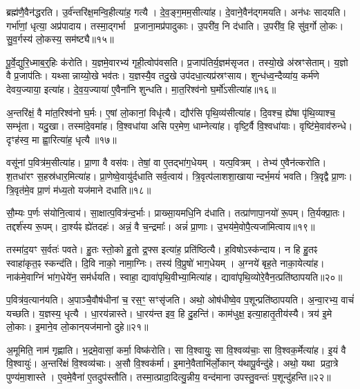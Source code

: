 ब्रह्म॑णै॒वैन॑द्धरति।
उ॒र्व॑न्तरि॑क्ष॒मन्वि॒हीत्या॑ह॒ गत्यै।
दे॒व॒ङ्ग॒मम॒सी\-त्या॑ह।
दे॒वाने॒वैन॑द्गमयति।
अन॑धः सादयति।
गर्भा॑णां॒ धृत्या॒ अप्र॑पादाय।
तस्मा॒द्गर्भा प्र॒जाना॒मप्र॑पादुकाः।
उ॒परी॑व॒ नि द॑धाति।
उ॒परी॑व॒ हि सु॑व॒र्गो लो॒कः।
सु॒व॒र्गस्य॑ लो॒कस्य॒ सम॑ष्ट्यै॥१५॥\anuvakamend[स॒यो॒नि॒त्वाय॑ स्व॒धाकृ॑ता॒\-ऽसीत्या॑ह दाया॒द्वेद॑ भरति जायन्ते॒ बृह॒स्पतिः॒ सम॑ष्ट्यै]

पू॒र्वे॒द्युरि॒ध्माब॒र्॒हिः क॑रोति।
य॒ज्ञमे॒वारभ्य॑ गृही॒त्वोप॑वसति।
प्र॒जाप॑तिर्य॒ज्ञम॑सृजत।
तस्यो॒खे अ॑स्रꣳसेताम्।
य॒ज्ञो वै प्र॒जाप॑तिः।
यथ्सान्नाय्यो॒खे भव॑तः।
य॒ज्ञस्यै॒व तदु॒खे उप॑दधा॒त्यप्र॑स्रꣳसाय।
शुन्ध॑ध्व॒न्दैव्या॑य॒ कर्म॑णे देवय॒ज्याया॒ इत्या॑ह।
दे॒व॒य॒ज्याया॑ ए॒वैना॑नि शुन्धति।
मा॒त॒रिश्व॑नो घ॒र्मो॑\-ऽसीत्या॑ह॥१६॥

अ॒न्तरि॑क्षं॒ वै मा॑त॒रिश्व॑नो घ॒र्मः।
ए॒षां लो॒कानां॒ विधृ॑त्यै।
द्यौर॑सि पृथि॒व्य॑सीत्या॑ह।
दि॒वश्च॒ ह्ये॑षा पृ॑थि॒व्याश्च॒ सम्भृ॑ता।
यदु॒खा।
तस्मा॑दे॒वमा॑ह।
वि॒श्वधा॑या असि पर॒मेण॒ धाम्नेत्या॑ह।
वृष्टि॒र्वै वि॒श्वधा॑याः।
वृष्टि॑मे॒वाव॑रुन्धे।
दृꣳह॑स्व॒ मा ह्वा॒रित्या॑ह॒ धृत्यै॥१७॥

वसू॑नां प॒वित्र॑म॒सीत्या॑ह।
प्रा॒णा वै वस॑वः।
तेषां॒ वा ए॒तद्भा॑ग॒धेयम्।
यत्प॒वित्रम्।
तेभ्य॑ ए॒वैन॑त्करोति।
श॒तधा॑रꣳ स॒हस्र॑धार॒मित्या॑ह।
प्रा॒णेष्वे॒वायु॑र्दधाति सर्व॒त्वाय॑।
त्रि॒वृत्प॑लाशशा॒खायान्दर्भ॒मयं॑ भवति।
त्रि॒वृद्वै प्रा॒णः।
त्रि॒वृत॑मे॒व प्रा॒णं म॑ध्य॒तो यज॑माने दधाति॥१८॥

सौ॒म्यः प॒र्णः स॑योनि॒त्वाय॑।
सा॒क्षात्प॒वित्र॑न्द॒र्भाः।
प्राख्सा॒यमधि॒नि द॑धाति।
तत्प्रा॑णापा॒नयो॑ रू॒पम्।
ति॒र्यक्प्रा॒तः।
तद्दर्श॑स्य रू॒पम्।
दा॒र्श्यꣴ ह्ये॑तदहः॑।
अन्नं॒ वै च॒न्द्रमाः᳚।
अन्नं॑ प्रा॒णाः।
उ॒भय॑मे॒वोपै॒त्यजा॑मित्वाय॥१९॥

तस्मा॑द॒यꣳ स॒र्वतः॑ पवते।
हु॒तः स्तो॒को हु॒तो द्र॒फ्स इत्या॑ह॒ प्रति॑ष्ठित्यै।
ह॒विषो\-ऽस्क॑न्दाय।
न हि हु॒तꣴ स्वाहा॑कृत॒ꣴ स्कन्द॑ति।
दि॒वि नाको॒ नामा॒ग्निः।
तस्य॑ वि॒प्रुषो॑ भाग॒धेयम्।
अ॒ग्नये॑ बृह॒ते नाका॒येत्या॑ह।
नाक॑मे॒वाग्निं भा॑ग॒धेये॑न॒ सम॑र्धयति।
स्वाहा॒ द्यावा॑पृथि॒वीभ्या॒मित्या॑ह।
द्यावा॑पृथि॒व्योरे॒वैन॒त्प्रति॑ष्ठापयति॥२०॥

प॒वित्र॑व॒त्यान॑यति।
अ॒पाञ्चै॒वौष॑धीनां च॒ रस॒ꣳ॒ सꣳसृ॑जति।
अथो॒ ओष॑धीष्वे॒व प॒शून्प्रति॑ष्ठापयति।
अ॒न्वा॒रभ्य॒ वाचं॑ यच्छति।
य॒ज्ञस्य॒ धृत्यै।
धा॒रय॑न्नास्ते।
धा॒रय॑न्त इव॒ हि दु॒हन्ति॑।
काम॑धुक्ष॒ इत्या॒हातृ॒तीय॑स्यै।
त्रय॑ इ॒मे लो॒काः।
इ॒माने॒व लो॒कान्‌यज॑मानो दुहे॥२१॥

अ॒मूमिति॒ नाम॑ गृह्णाति।
भ॒द्रमे॒वासां॒ कर्मा॒ विष्क॑रोति।
सा वि॒श्वायुः॒ सा वि॒श्वव्य॑चाः॒ सा वि॒श्वक॒र्मेत्या॑ह।
इ॒यं वै वि॒श्वायुः॑।
अ॒न्तरि॑क्षं वि॒श्वव्य॑चाः।
अ॒सौ वि॒श्वक॑र्मा।
इ॒माने॒वैताभि॑र्लो॒कान्‌ य॑थापू॒र्वन्दु॑हे।
अथो॒ यथा प्रदा॒त्रे पुण्य॑मा॒शास्ते।
ए॒वमे॒वैना॑ ए॒तदुप॑स्तौति।
तस्मा॒त्प्रादा॒दित्यु॒न्नीय॒ वन्द॑माना उपस्तु॒वन्तः॑ प॒शून्दु॑\-हन्ति॥२२॥

